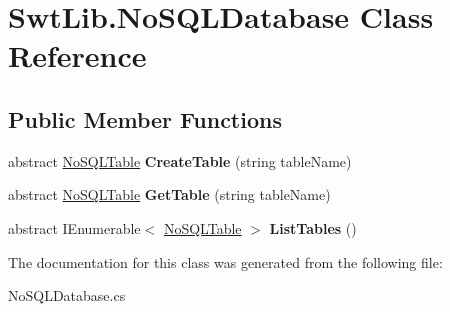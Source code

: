 \hypertarget{class_swt_lib_1_1_no_s_q_l_database}{\section{Swt\-Lib.\-No\-S\-Q\-L\-Database Class Reference}
\label{class_swt_lib_1_1_no_s_q_l_database}
}
\subsection*{Public Member Functions}
\begin{DoxyCompactItemize}
\item 
\hypertarget{class_swt_lib_1_1_no_s_q_l_database_a2da613fe1a8427bd2ffc02ebc01c0f60}{abstract \hyperlink{interface_swt_lib_1_1_no_s_q_l_table}{No\-S\-Q\-L\-Table} {\bfseries Create\-Table} (string table\-Name)}\label{class_swt_lib_1_1_no_s_q_l_database_a2da613fe1a8427bd2ffc02ebc01c0f60}

\item 
\hypertarget{class_swt_lib_1_1_no_s_q_l_database_acce068a352112abaa2aabe3da060b19a}{abstract \hyperlink{interface_swt_lib_1_1_no_s_q_l_table}{No\-S\-Q\-L\-Table} {\bfseries Get\-Table} (string table\-Name)}\label{class_swt_lib_1_1_no_s_q_l_database_acce068a352112abaa2aabe3da060b19a}

\item 
\hypertarget{class_swt_lib_1_1_no_s_q_l_database_ab2e777e1f340fb0babe63924cd398d41}{abstract I\-Enumerable$<$ \hyperlink{interface_swt_lib_1_1_no_s_q_l_table}{No\-S\-Q\-L\-Table} $>$ {\bfseries List\-Tables} ()}\label{class_swt_lib_1_1_no_s_q_l_database_ab2e777e1f340fb0babe63924cd398d41}

\end{DoxyCompactItemize}


The documentation for this class was generated from the following file\-:\begin{DoxyCompactItemize}
\item 
No\-S\-Q\-L\-Database.\-cs\end{DoxyCompactItemize}
